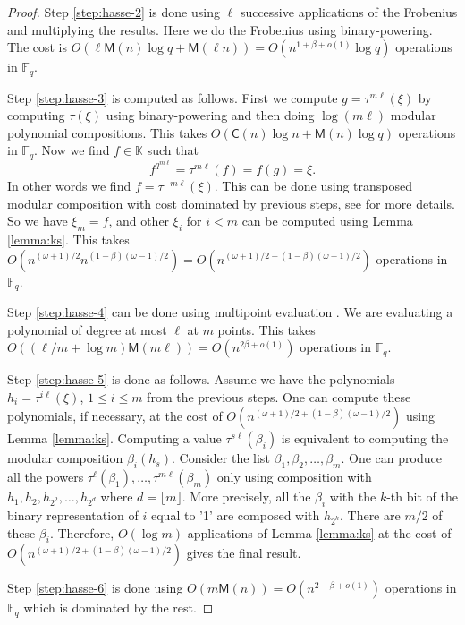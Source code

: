 \documentclass[12pt]{article}
\theoremstyle{plain}
\theoremstyle{definition}
\def\F{\ensuremath{\mathbb{F}}}
\def\K{\ensuremath{\mathbb{K}}}
\def\MM{\ensuremath{\mathsf{M}}}
\def\CC{\ensuremath{\mathsf{C}}}
\begin{document}
\begin{proof}
Step \ref{step:hasse-2} is done using $\ell$ successive applications of the Frobenius and 
multiplying the results. Here we do the Frobenius using binary-powering. The cost is 
$O(\ell\MM(n)\log q + \MM(\ell n)) = O(n^{1 + \beta + o(1)}\log q)$ operations in $\F_q$.

Step \ref{step:hasse-3} is computed as follows. First we compute $g = \tau^{m\ell}(\xi)$ by 
computing $\tau(\xi)$ using binary-powering and then doing $\log (m\ell)$ modular polynomial compositions. This takes $O(\CC(n)\log n + \MM(n)\log q)$ operations in $\F_q$. Now we find $f \in \K$ such that \[f^{q^{m\ell}} = \tau^{m\ell}(f) = f(g) = \xi.\]
In other words we find $f = \tau^{-m\ell}(\xi)$. This can be done using transposed modular 
composition with cost dominated by previous steps, see \cite{DeDoSc2014} for more details. So we 
have $\xi_m = f$, and other $\xi_i$ for $i < m$ can be computed using Lemma \ref{lemma:ks}. This 
takes $O(n^{(\omega + 1) / 2}n^{(1 - \beta)(\omega - 1) / 2}) = O(n^{(\omega + 1) / 2 + (1 - 
\beta)(\omega - 1) / 2})$ operations in $\F_q$.

Step \ref{step:hasse-4} can be done using multipoint evaluation \cite{vzGG}. We are evaluating a 
polynomial of degree at most $\ell$ at $m$ points. This takes $O((\ell / m + \log m) \MM(m\ell)) = 
O(n^{2\beta + o(1)})$ operations in $\F_q$.

Step \ref{step:hasse-5} is done as follows. Assume we have the polynomials $h_i = 
\tau^{i\ell}(\xi)$, $1 \le i \le m$ from the previous steps. One can compute these polynomials, if
necessary, at the cost of $O(n^{(\omega + 1) / 2 + (1 - \beta)(\omega - 1) / 2})$ using Lemma 
\ref{lemma:ks}. Computing a value $\tau^{s\ell}(\beta_i)$ is equivalent to computing the modular 
composition $\beta_i(h_s)$. Consider the list $\beta_1, \beta_2, \dots, \beta_m$. One can produce 
all the powers $\tau^{\ell}(\beta_1), \dots, \tau^{m\ell}(\beta_m)$ only using composition with 
$h_1, h_2, h_{2^2}, \dots, h_{2^d}$ where $d = \lfloor m \rfloor$. More precisely, all the 
$\beta_i$ with the $k$-th bit of the binary representation of $i$ equal to '1' are composed with 
$h_{2^k}$. There are $m / 2$ of these $\beta_i$. Therefore, $O(\log m)$ applications of Lemma 
\ref{lemma:ks} at the cost of $O(n^{(\omega + 1) / 2 + (1 - \beta)(\omega - 1) / 2})$ gives the 
final result. 

Step \ref{step:hasse-6} is done using $O(m\MM(n)) = O(n^{2 - \beta + o(1)})$ operations in $\F_q$ 
which is dominated by the rest.
\end{proof}
\end{document}
